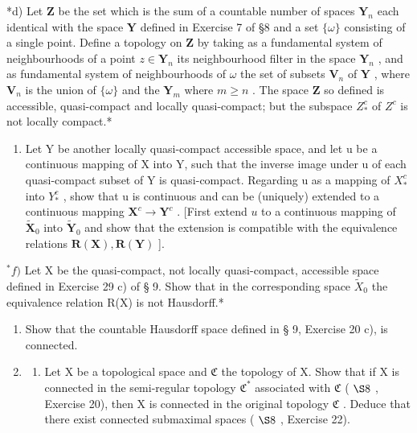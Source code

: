 *d) Let \(\mathbf{Z}\) be the set which is the sum of a countable number of spaces \(\mathbf{Y}_n\) each identical with the space \(\mathbf{Y}\) defined in Exercise 7 of §8 and a set \(\{\omega\}\) consisting of a single point. Define a topology on \(\mathbf{Z}\) by taking as a fundamental system of neighbourhoods of a point \(z \in \mathbf{Y}_n\) its neighbourhood filter in the space \(\mathbf{Y}_n\) , and as fundamental system of neighbourhoods of \(\omega\) the set of subsets \(\mathbf{V}_n\) of \(\mathbf{Y}\) , where \(\mathbf{V}_n\) is the union of \(\{\omega\}\) and the \(\mathbf{Y}_m\) where \(m \geqslant n\) . The space \(\mathbf{Z}\) so defined is accessible, quasi-compact and locally quasi-compact; but the subspace \(Z_*^c\) of \(Z^c\) is not locally compact.*

\begin{enumerate}
\def\labelenumi{\alph{enumi})}
\setcounter{enumi}{4}
\tightlist
\item
  Let Y be another locally quasi-compact accessible space, and let u be a continuous mapping of X into Y, such that the inverse image under u of each quasi-compact subset of Y is quasi-compact. Regarding u as a mapping of \(X_{*}^{c}\) into \(Y_{*}^{c}\) , show that u is continuous and can be (uniquely) extended to a continuous mapping \(\mathbf{X}^c\to \mathbf{Y}^c\) . {[}First extend \(u\) to a continuous mapping of \(\tilde{\mathbf{X}}_0\) into \(\tilde{\mathbf{Y}}_0\) and show that the extension is compatible with the equivalence relations \(\mathbf{R}(\mathbf{X}),\mathbf{R}(\mathbf{Y})\) {]}.
\end{enumerate}

\(^{*}f)\) Let X be the quasi-compact, not locally quasi-compact, accessible space defined in Exercise 29 c) of § 9. Show that in the corresponding space \(\tilde{X}_{0}\) the equivalence relation R(X) is not Hausdorff.*

\BourbakiExerciseGroup

\begin{enumerate}
\def\labelenumi{\arabic{enumi})}
\item
  Show that the countable Hausdorff space defined in § 9, Exercise 20 c), is connected.
\item
  \begin{enumerate}
  \def\labelenumii{\alph{enumii})}
  \tightlist
  \item
    Let X be a topological space and \(\mathfrak{C}\) the topology of X. Show that if X is connected in the semi-regular topology \(\mathfrak{C}^*\) associated with \(\mathfrak{C}\) ( \(\S 8\) , Exercise 20), then X is connected in the original topology \(\mathfrak{C}\) . Deduce that there exist connected submaximal spaces ( \(\S 8\) , Exercise 22).
  \end{enumerate}
\end{enumerate}

